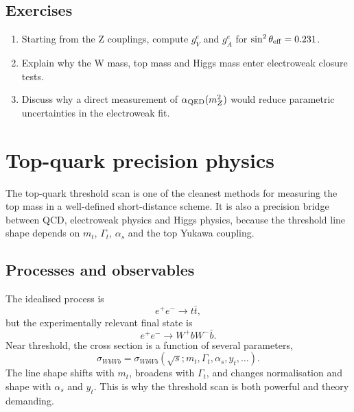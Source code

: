 \documentclass[11pt,a4paper]{article}
\numberwithin{equation}{section}
\begin{document}
\subsection{Exercises}
\begin{enumerate}[leftmargin=1.6em]
\item Starting from the Z couplings, compute \(g_V^e\) and \(g_A^e\) for \(\sin^2\theta_{\rm eff}=0.231\).
\item Explain why the W mass, top mass and Higgs mass enter electroweak closure tests.
\item Discuss why a direct measurement of \(\alpha_{\rm QED}(m_Z^2)\) would reduce parametric uncertainties in the electroweak fit.
\end{enumerate}


\newpage
\section{Top-quark precision physics}
\begin{guidelinebox}
The top-quark threshold scan is one of the cleanest methods for measuring the top mass in a well-defined short-distance scheme. It is also a precision bridge between QCD, electroweak physics and Higgs physics, because the threshold line shape depends on \(m_t\), \(\Gamma_t\), \(\alpha_s\) and the top Yukawa coupling.
\end{guidelinebox}

\subsection{Processes and observables}
The idealised process is
\begin{equation}
  e^+e^-\to t\bar t,
\end{equation}
but the experimentally relevant final state is
\begin{equation}
  e^+e^-\to W^+bW^-\bar b .
\end{equation}
Near threshold, the cross section is a function of several parameters,
\begin{equation}
  \sigma_{WbWb}=\sigma_{WbWb}\left(\sqrt{s};m_t,\Gamma_t,\alpha_s,y_t,\ldots\right) .
  \label{eq:top-threshold-cross-section}
\end{equation}
The line shape shifts with \(m_t\), broadens with \(\Gamma_t\), and changes normalisation and shape with \(\alpha_s\) and \(y_t\). This is why the threshold scan is both powerful and theory demanding.
\end{document}

